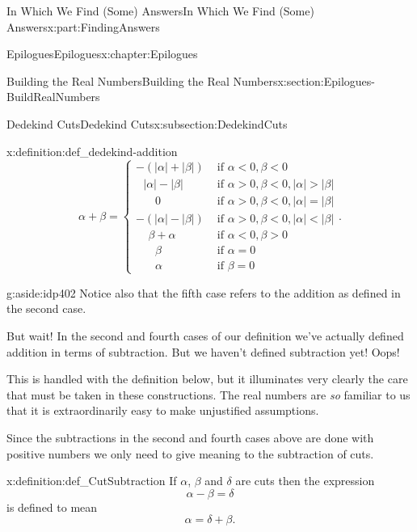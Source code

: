 \documentclass[oneside,10pt,]{book}
\numberwithin{equation}{section}
\newcommand{\abs}[1]{\left|#1\right|}
\newcommand{\lt}{<}
\newcommand{\amp}{&}
\begin{document}
\begin{partptx}{In Which We Find (Some) Answers}{}{In Which We Find (Some) Answers}{}{}{x:part:FindingAnswers}
\begin{chapterptx}{Epilogues}{}{Epilogues}{}{}{x:chapter:Epilogues}
\begin{sectionptx}{Building the Real Numbers}{}{Building the Real Numbers}{}{}{x:section:Epilogues-BuildRealNumbers}
\begin{subsectionptx}{Dedekind Cuts}{}{Dedekind Cuts}{}{}{x:subsection:DedekindCuts}
\begin{definition}{}{x:definition:def_dedekind-addition}
\begin{equation*}
\alpha+\beta= \begin{cases}-(\abs{\alpha}+\abs{\beta}) \amp  \text{ if \(\alpha\lt 0, \beta\lt 0 \) } \\ \ \ \ \abs{\alpha}-\abs{\beta}\amp  \text{ if \(\alpha>0, \beta\lt 0, \abs{\alpha}>\abs{\beta} \)} \\ \ \ \ \ \ \ \ \,0             \amp  \text{ if \(\alpha>0, \beta\lt 0, \abs{\alpha}=\abs{\beta} \)} \\ -(\abs{\alpha}-\abs{\beta})   \amp  \text{ if \(\alpha>0, \beta\lt 0, \abs{\alpha}\lt \abs{\beta} \)} \\ \ \ \ \ \ \beta+\alpha        \amp  \text{ if \(\alpha\lt 0, \beta>0 \) } \\ \ \ \ \ \ \ \ \,\beta{}       \amp  \text{ if \(\alpha=0 \) } \\ \ \ \ \ \ \ \ \,\alpha        \amp  \text{ if \(\beta=0 \) } \end{cases} \text{.}
\end{equation*}
%
\end{definition}
\begin{aside}{}{g:aside:idp402}%
Notice also that the fifth case refers to the addition as defined in the second case.%
\end{aside}
But wait!  In the second and fourth cases of our definition we've actually defined addition in terms of subtraction. But we haven't defined subtraction yet!  Oops!%
\par
This is handled with the definition below, but it illuminates very clearly the care that must be taken in these constructions. The real numbers are \emph{so} familiar to us that it is extraordinarily easy to make unjustified assumptions.%
\par
Since the subtractions in the second and fourth cases above are done with positive numbers we only need to give meaning to the subtraction of cuts.%
\begin{definition}{}{x:definition:def_CutSubtraction}%
 If \(\alpha\), \(\beta\) and \(\delta\) are cuts then the expression%
\begin{equation*}
\alpha-\beta=\delta
\end{equation*}
is defined to mean%
\begin{equation*}
\alpha=\delta+\beta\text{.}
\end{equation*}
%
\end{definition}

\end{subsectionptx}
\end{sectionptx}
\end{chapterptx}
\end{partptx}
\end{document}
